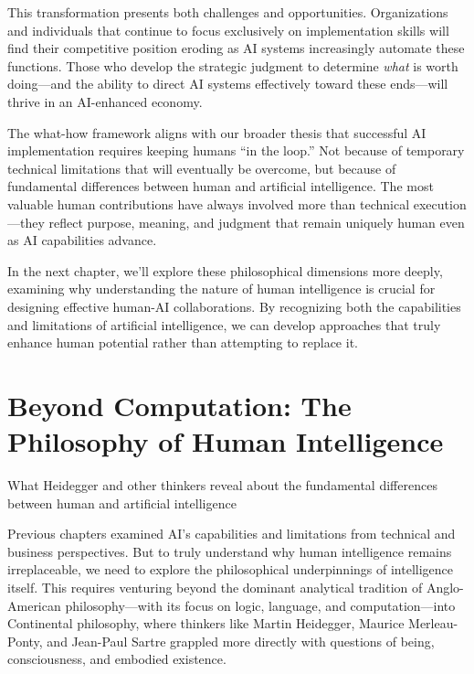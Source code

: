 \documentclass[
  Letterpaper,
]{scrbook}
\begin{document}
This transformation presents both challenges and opportunities.
Organizations and individuals that continue to focus exclusively on
implementation skills will find their competitive position eroding as AI
systems increasingly automate these functions. Those who develop the
strategic judgment to determine \emph{what} is worth doing---and the
ability to direct AI systems effectively toward these ends---will thrive
in an AI-enhanced economy.

The what-how framework aligns with our broader thesis that successful AI
implementation requires keeping humans ``in the loop.'' Not because of
temporary technical limitations that will eventually be overcome, but
because of fundamental differences between human and artificial
intelligence. The most valuable human contributions have always involved
more than technical execution---they reflect purpose, meaning, and
judgment that remain uniquely human even as AI capabilities advance.

In the next chapter, we'll explore these philosophical dimensions more
deeply, examining why understanding the nature of human intelligence is
crucial for designing effective human-AI collaborations. By recognizing
both the capabilities and limitations of artificial intelligence, we can
develop approaches that truly enhance human potential rather than
attempting to replace it.


\chapter{Beyond Computation: The Philosophy of Human
Intelligence}\label{beyond-computation-the-philosophy-of-human-intelligence}

What Heidegger and other thinkers reveal about the fundamental
differences between human and artificial intelligence

\hfill\break

Previous chapters examined AI's capabilities and limitations from
technical and business perspectives. But to truly understand why human
intelligence remains irreplaceable, we need to explore the philosophical
underpinnings of intelligence itself. This requires venturing beyond the
dominant analytical tradition of Anglo-American philosophy---with its
focus on logic, language, and computation---into Continental philosophy,
where thinkers like Martin Heidegger, Maurice Merleau-Ponty, and
Jean-Paul Sartre grappled more directly with questions of being,
consciousness, and embodied existence.
\end{document}

